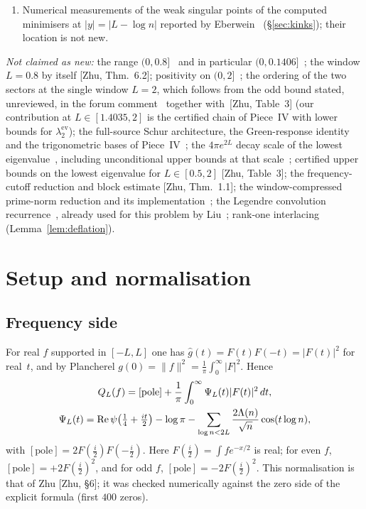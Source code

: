 \documentclass[11pt]{amsart}
\newcommand{\ev}{\mathrm{ev}}
\newcommand{\re}{\operatorname{Re}}
\newcommand{\pole}{\mathrm{pole}}
\theoremstyle{definition}
\theoremstyle{remark}
\numberwithin{equation}{section}
\begin{document}
\begin{enumerate}
\item Numerical measurements of the weak singular points of the computed minimisers at $|y|=|L-\log n|$ reported by Eberwein~\cite[\S13]{Eberwein} (\S\ref{sec:kinks}); their location is not new.
\end{enumerate}
\emph{Not claimed as new:} the range $(0,0.8]$~\cite{KB} and in particular $(0,0.1406]$~\cite{PL}; the window $L=0.8$ by itself [Zhu, Thm.~6.2]; positivity on $(0,2]$~\cite{rh45,rh60}; the ordering of the two sectors at the single window $L=2$, which follows from the odd bound stated, unreviewed, in the forum comment~\cite{rh60gap} together with~[Zhu, Table~3] (our contribution at $L\in[1.4035,2]$ is the certified chain of Piece~IV with lower bounds for $\lambda_2^\ev$); the full-source Schur architecture, the Green-response identity and the trigonometric bases of Piece~IV~\cite{rh45,rh60}; the $4\pi e^{2L}$ decay scale of the lowest eigenvalue~\cite{Connes26,MoriV,rh80,rh81,rh83}, including unconditional upper bounds at that scale~\cite{rh83}; certified upper bounds on the lowest eigenvalue for $L\in[0.5,2]$ [Zhu, Table~3]; the frequency-cutoff reduction and block estimate [Zhu, Thm.~1.1]; the window-compressed prime-norm reduction and its implementation~\cite{Elston}; the Legendre convolution recurrence~\cite{HaleTownsend}, already used for this problem by Liu~\cite{Liu}; rank-one interlacing (Lemma~\ref{lem:deflation}).

\section{Setup and normalisation}\label{sec:setup}

\subsection{Frequency side}
For real $f$ supported in $[-L,L]$ one has $\hat g(t)=F(t)F(-t)=|F(t)|^2$ for real~$t$, and by Plancherel $g(0)=\|f\|^2=\frac1\pi\int_0^\infty|F|^2$. Hence
\begin{gather}\label{eq:freq}
Q_L(f)=[\pole]+\frac1\pi\int_0^\infty\Psi_L(t)|F(t)|^2\,dt,\\
\Psi_L(t)=\re\psi\bigl(\tfrac14+\tfrac{it}2\bigr)-\log\pi-\sum_{\log n<2L}\frac{2\Lambda(n)}{\sqrt n}\cos(t\log n),\notag
\end{gather}
with $[\pole]=2F(\tfrac i2)F(-\tfrac i2)$. Here $F(\tfrac i2)=\int fe^{-x/2}$ is real; for even $f$, $[\pole]=+2F(\tfrac i2)^2$, and for odd $f$, $[\pole]=-2F(\tfrac i2)^2$. This normalisation is that of Zhu [Zhu, \S6]; it was checked numerically against the zero side of the explicit formula (first $400$ zeros).
\end{document}

